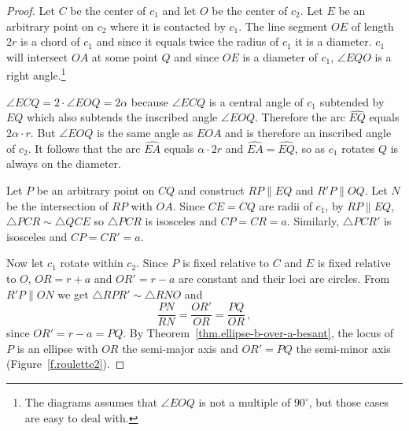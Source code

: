 \begin{proof}
Let $C$ be the center of $c_1$ and let $O$ be the center of $c_2$. Let $E$ be an arbitrary point on $c_2$ where it is contacted by $c_1$. The line segment $OE$ of length $2r$ is a chord of $c_1$ and since it equals twice the radius of $c_1$ it is a diameter. $c_1$ will intersect $OA$ at some point $Q$ and since $OE$ is a diameter of $c_1$, $\angle EQO$ is a right angle.\footnote{The diagrams assumes that $\angle EOQ$ is not a multiple of $90^\circ$, but those cases are easy to deal with.}

$\angle ECQ=2\cdot\angle EOQ=2\alpha$ because $\angle ECQ$ is a central angle of $c_1$ subtended by $EQ$ which also subtends the inscribed angle $\angle EOQ$. Therefore the arc $\widehat{EQ}$ equals $2\alpha \cdot r$. But $\angle EOQ$ is the same angle as $EOA$ and is therefore an inscribed angle of $c_2$. It follows that the arc $\widehat{EA}$ equals $\alpha \cdot 2r$ and $\widehat{EA} =\widehat{EQ}$, so as $c_1$ rotates $Q$ is always on the diameter.

Let $P$ be an arbitrary point on $CQ$ and construct $RP\parallel EQ$ and $R'P\parallel OQ$. Let $N$ be the intersection of $RP$ with $OA$. Since $CE=CQ$ are radii of $c_1$, by $RP\parallel EQ$, $\triangle PCR\sim \triangle QCE$ so $\triangle PCR$ is isosceles and $CP=CR=a$. Similarly, $\triangle PCR'$ is isosceles and $CP=CR'=a$.

Now let $c_1$ rotate within $c_2$. Since $P$ is fixed relative to $C$ and $E$ is fixed relative to $O$, $OR=r+a$ and $OR'=r-a$ are constant and their loci are circles. From $R'P\parallel ON$ we get $\triangle RPR'\sim \triangle RNO$ and
\[
\frac{PN}{RN} = \frac{OR'}{OR}=\frac{PQ}{OR}\,,
\]
since $OR'=r-a=PQ$. By Theorem~\ref{thm.ellipse-b-over-a-besant}, the locus of $P$ is an ellipse with $OR$ the semi-major axis and $OR'=PQ$ the semi-minor axis (Figure~\ref{f.roulette2}).\hqed
\end{proof}

